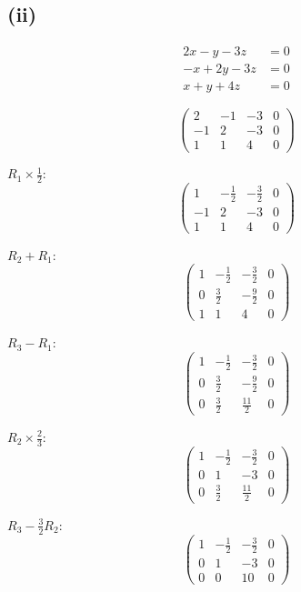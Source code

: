 \subsection*{(ii)}
\begin{align*}
	2x - y - 3z  & = 0 \\
	-x + 2y - 3z & = 0 \\
	x + y + 4z   & = 0
\end{align*}

\[
	\left(\begin{array}{ccc|c}
			2  & -1 & -3 & 0 \\
			-1 & 2  & -3 & 0 \\
			1  & 1  & 4  & 0
		\end{array}\right)
\]

$R_1 \times \frac{1}{2}$:
\[
	\left(\begin{array}{ccc|c}
			1  & -\frac{1}{2} & -\frac{3}{2} & 0 \\
			-1 & 2           & -3           & 0 \\
			1  & 1           & 4            & 0
		\end{array}\right)
\]

$R_2 + R_1$:
\[
	\left(\begin{array}{ccc|c}
			1 & -\frac{1}{2} & -\frac{3}{2} & 0 \\
			0 & \frac{3}{2}  & -\frac{9}{2} & 0 \\
			1 & 1           & 4            & 0
		\end{array}\right)
\]

$R_3 - R_1$:
\[
	\left(\begin{array}{ccc|c}
			1 & -\frac{1}{2} & -\frac{3}{2} & 0 \\
			0 & \frac{3}{2}  & -\frac{9}{2} & 0 \\
			0 & \frac{3}{2}  & \frac{11}{2} & 0
		\end{array}\right)
\]

$R_2 \times \frac{2}{3}$:
\[
	\left(\begin{array}{ccc|c}
			1 & -\frac{1}{2} & -\frac{3}{2} & 0 \\
			0 & 1           & -3           & 0 \\
			0 & \frac{3}{2}  & \frac{11}{2} & 0
		\end{array}\right)
\]

$R_3 - \frac{3}{2}R_2$:
\[
	\left(\begin{array}{ccc|c}
			1 & -\frac{1}{2} & -\frac{3}{2} & 0 \\
			0 & 1           & -3           & 0 \\
			0 & 0           & 10           & 0
		\end{array}\right)
\]

